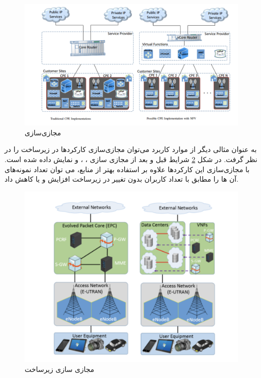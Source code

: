 \begin{figure}[h!]
\center\includegraphics[scale=.5]{images/cpe}
\caption{مجازی‌سازی }
\label{fig.20}
\end{figure}

به عنوان مثالی دیگر از موارد کاربرد می‌توان مجازی‌سازی کارکردها در زیرساخت  را در نظر گرفت.
در شکل \ref{fig.21} شرایط قبل و بعد از مجازی سازی
، ،  و 
نمایش داده شده است.
با مجازی‌سازی این کارکردها علاوه بر استفاده بهتر از منابع، می توان تعداد نمونه‌های آن ها را مطابق با تعداد کاربران بدون تغییر در زیرساخت افزایش و یا کاهش داد.

\begin{figure}[h!]
\center\includegraphics[scale=.5]{images/lte}
\caption{مجازی سازی زیرساخت }
\label{fig.21}
\end{figure}

